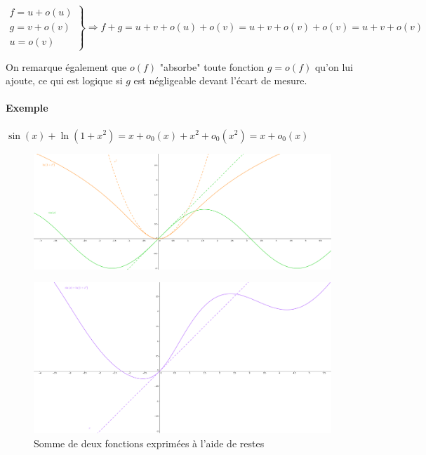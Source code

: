 \documentclass[]{article}
\begin{document}
\begin{enumerate}
	$$\left. \begin{array}{c}
		f = u + o(u) \\
		g = v + o(v) \\
		u=o(v)
	\end{array} \right\} \Longrightarrow f + g = u + v + o(u) + o(v) = u + v + o(v) + o(v) = u + v + o(v)$$

	On remarque également que $o(f)$ "absorbe" toute fonction $g=o(f)$ qu'on lui ajoute, ce qui est logique si $g$ est négligeable devant l'écart de mesure.

	\paragraph{Exemple}
	$\sin(x)+\ln(1+x^2)=x+o_0(x)+x^2+o_0(x^2)=x+o_0(x)$

	\begin{figure}[!h]
		\includegraphics[width=500pt]{Images/SommeResteGrossier1}
	\end{figure}

	\begin{figure}[!h]
		\includegraphics[width=500pt]{Images/SommeResteGrossier2}
		\caption{Somme de deux fonctions exprimées à l'aide de restes}
	\end{figure}
\end{enumerate}

\newpage
\end{document}
